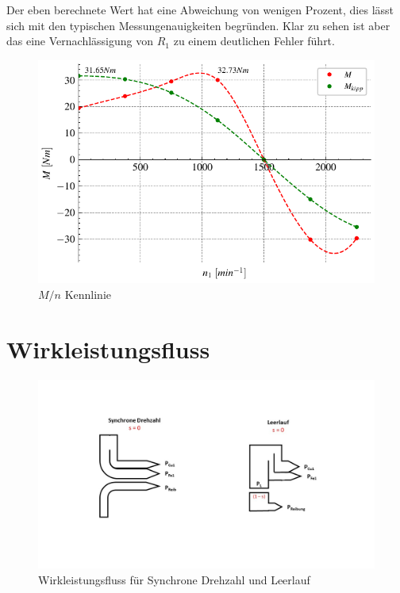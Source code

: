 \documentclass[conference]{IEEEtran}
\begin{document}
Der eben berechnete Wert hat eine Abweichung von wenigen Prozent, dies lässt
sich mit den typischen Messungenauigkeiten begründen. Klar zu sehen ist aber
das eine Vernachlässigung von $R_{1}$ zu einem deutlichen Fehler führt.

\begin{figure}[htbp]
    \centering
    \includegraphics[width=\columnwidth]{./figures/m_n-kennlinie.pdf}
    \caption{$M/n$ Kennlinie}
    \label{fig:m_n-kennlinie}
\end{figure}


\section{Wirkleistungsfluss}

\begin{figure}[htbp]
    \centering
    \includegraphics[width=\columnwidth]{./figures/Wirkleistungsfluss.jpg}
    \caption{Wirkleistungsfluss für Synchrone Drehzahl und Leerlauf}
\end{figure}
\end{document}
